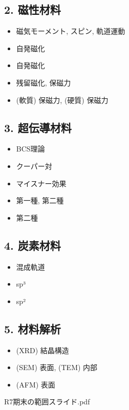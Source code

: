 \documentclass[11pt,a4paper]{ltjsarticle}
\begin{document}
\subsection*{2. 磁性材料}
\begin{itemize}
    \item 磁気モーメント, スピン, 軌道運動
    \item 自発磁化
    \item 自発磁化
    \item 残留磁化, 保磁力
    \item (軟質) 保磁力, (硬質) 保磁力
\end{itemize}

\subsection*{3. 超伝導材料}
\begin{itemize}
    \item BCS理論
    \item クーパー対
    \item マイスナー効果
    \item 第一種, 第二種
    \item 第二種
\end{itemize}

\subsection*{4. 炭素材料}
\begin{itemize}
    \item 混成軌道
    \item sp³
    \item sp²
\end{itemize}

\subsection*{5. 材料解析}
\begin{itemize}
    \item (XRD) 結晶構造
    \item (SEM) 表面, (TEM) 内部
    \item (AFM) 表面
\end{itemize}


\begin{thebibliography}{9}
     R7期末の範囲スライド.pdf
\end{thebibliography}
\end{document}
